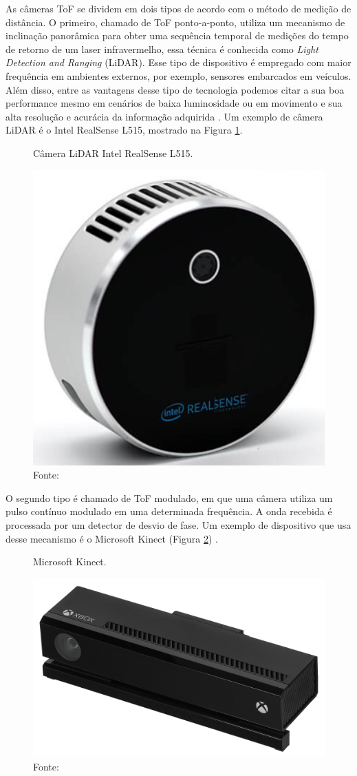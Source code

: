  As câmeras ToF se dividem em dois tipos de acordo com o método de medição de distância. O primeiro, chamado de ToF ponto-a-ponto, utiliza um mecanismo de inclinação panorâmica para obter uma sequência temporal de medições do tempo de retorno de um laser infravermelho, essa técnica é conhecida como \textit{Light Detection and Ranging} (LiDAR). Esse tipo de dispositivo é empregado com maior frequência em ambientes externos, por exemplo, sensores embarcados em veículos. Além disso, entre as vantagens desse tipo de tecnologia podemos citar a sua boa performance mesmo em cenários de baixa luminosidade ou em movimento e sua alta resolução e acurácia da informação adquirida \cite{zollhofer2019commodity}. Um exemplo de câmera LiDAR é o Intel RealSense L515, mostrado na Figura \ref{fig:lidar}.

 \begin{figure}[h]
    \centering
    \caption{Câmera LiDAR Intel RealSense L515.}
    \includegraphics[width=.4\textwidth]{fig/lidar_cams.png}
    \caption*{Fonte: \cite{castellano2023performance}}
    \label{fig:lidar}
\end{figure}

O segundo tipo é chamado de ToF modulado, em que uma câmera utiliza um pulso contínuo modulado em uma determinada frequência. A onda recebida é processada por um detector de desvio de fase. Um exemplo de dispositivo que usa desse mecanismo é o Microsoft Kinect (Figura \ref{fig:kinect}) \cite{zollhofer2019commodity}.

\begin{figure}[h]
    \centering
    \caption{Microsoft Kinect.}
    \includegraphics[width=.6\textwidth]{fig/kinect.jpg}
    \caption*{Fonte: \cite{kinect}}
    \label{fig:kinect}
\end{figure}

